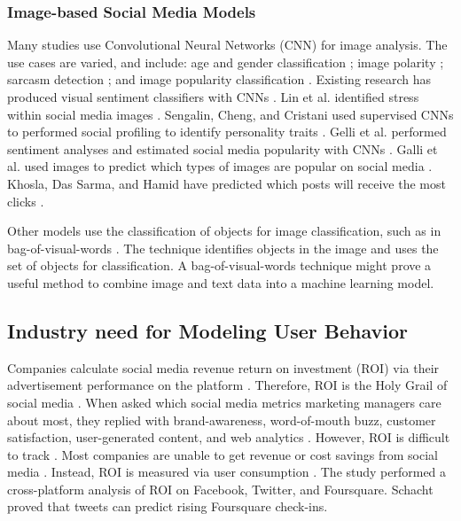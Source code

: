 \documentclass{article}
\begin{document}
\subsubsection{Image-based Social Media Models}
Many studies use Convolutional Neural Networks (CNN) for image analysis. The use cases are varied, and include: age and gender classification \cite{Hassner2015}; image polarity \cite{Poria2016}; sarcasm detection \cite{Poria2016}; and image popularity classification \cite{Khosla2014}. Existing research has produced visual sentiment classifiers with CNNs \cite{Segalin2017,Xu2014}. Lin et al. identified stress within social media images \cite{Lin2014}. Sengalin, Cheng, and Cristani used supervised CNNs to performed social profiling to identify personality traits \cite{Segalin2017}. Gelli et al. performed sentiment analyses and estimated social media popularity with CNNs \cite{Gelli2015}. Galli et al. used images to predict which types of images are popular on social media \cite{Gelli2015}.  Khosla, Das Sarma, and Hamid have predicted which posts will receive the most clicks \cite{Khosla2014}.  

Other models use the classification of objects for image classification, such as in bag-of-visual-words \cite{Mandhyani2017}. The technique identifies objects in the image and uses the set of objects for classification. A bag-of-visual-words technique might prove a useful method to combine image and text data into a machine learning model.

\subsection{Industry need for Modeling User Behavior}

Companies calculate social media revenue return on investment (ROI) via their advertisement performance on the platform \cite{Fisher2009}. Therefore, ROI is the Holy Grail of social media \cite{Fisher2009}. When asked which social media metrics marketing managers care about most, they replied with brand-awareness, word-of-mouth buzz, customer satisfaction, user-generated content, and web analytics \cite{Tiago2014}. However, ROI is difficult to track \cite{Schacht2015}. Most companies are unable to get revenue or cost savings from social media \cite{Romero2011}. Instead, ROI is measured via user consumption \cite{Schacht2015}. The study performed a cross-platform analysis of ROI on Facebook, Twitter, and Foursquare. Schacht proved that tweets can predict rising Foursquare check-ins.
\end{document}
